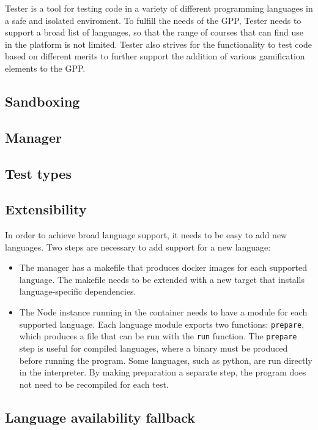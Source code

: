 Tester is a tool for testing code in a variety of different programming languages in a safe and isolated enviroment. To fulfill the needs of the GPP, Tester needs to support a  broad list of languages, so that the range of courses that can find use in the platform is not limited. Tester also strives for the functionality to test code based on different merits to further support the addition of various gamification elements to the GPP.

\subsection{Sandboxing}
\subsection{Manager}
\subsection{Test types}

\subsection{Extensibility}
In order to achieve broad language support, it needs to be easy to add new languages. Two steps are necessary to add support for a new language:

\begin{itemize}
\item The manager has a makefile that produces docker images for each supported language. The makefile needs to be extended with a new target that installs language-specific dependencies.

\item The Node instance running in the container needs to have a module for each supported language. Each language module exports two functions: \texttt{prepare}, which produces a file that can be run with the \texttt{run} function. The \texttt{prepare} step is useful for compiled languages, where a binary must be produced before running the program. Some languages, such as python, are run directly in the interpreter. By making preparation a separate step, the program does not need to be recompiled for each test.
\end{itemize}

\subsection{Language availability fallback}
